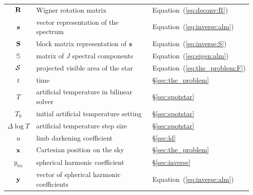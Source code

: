\documentclass[modern]{aastex631}
\begin{document}
\begin{center}
\begin{longtable}{cll}
        ${\mathbf{R}}$                                          & Wigner rotation matrix                                       & Equation~(\ref{eq:deconv:R})               \\
        ${\mathbf{s}}$                                          & vector representation of the spectrum                        & Equation~(\ref{eq:inverse:alm})          \\
        ${\mathbf{S}}$                                          & block matrix representation of ${\mathbf{s}}$                    & Equation~(\ref{eq:inverse:S})              \\
        $\boldsymbol{\mathbb{S}}$                           & matrix of $J$ spectral components                            & Equation~(\ref{eq:eigen:alm})            \\
        $\mathcal{S}$                                             & projected visible area of the star                           & Equation~(\ref{eq:the_problem:F})          \\
        $t$                                                 & time                                                         & \S\ref{sec:the_problem}                    \\
        $T$                                                 & artificial temperature in bilinear solver                    & \S\ref{sec:spotstar}                       \\
        $T_0$                                               & initial artificial temperature setting                       & \S\ref{sec:spotstar}                       \\
        $\Delta\log T$                                      & artificial temperature step size                             & \S\ref{sec:spotstar}                       \\
        $u$                                                 & limb darkening coefficient                                   & \S\ref{sec:ld}                             \\
        ${\mathbf{x}}$                                                & Cartesian position on the sky                                & \S\ref{sec:the_problem}                    \\
        $y_{lm}$                                            & spherical harmonic coefficient                               & \S\ref{sec:inverse}                        \\
        ${\mathbf{y}}$                                          & vector of spherical harmonic coefficients                    & Equation~(\ref{eq:inverse:alm})          \\

\end{longtable}
\end{center}
\end{document}
